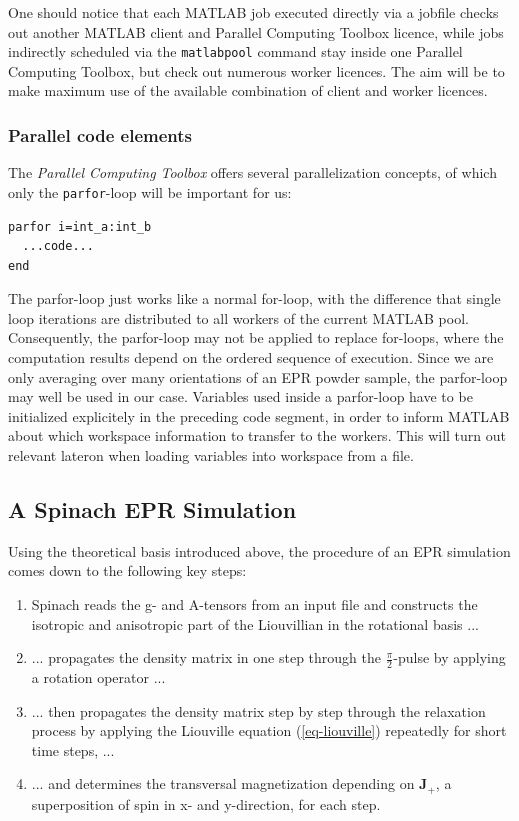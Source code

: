 \documentclass[11.5pt,a4paper]{article}
\begin{document}
One should notice that each MATLAB job executed directly via a jobfile checks out another MATLAB client and Parallel Computing Toolbox licence, while jobs indirectly scheduled via the \verb$matlabpool$ command stay inside one Parallel Computing Toolbox, but check out numerous worker licences. The aim will be to make maximum use of the available combination of client and worker licences.

\subsubsection{Parallel code elements}
The \emph{Parallel Computing Toolbox} offers several parallelization concepts, of which only the \verb$parfor$-loop will be important for us:
\begin{lstlisting}
parfor i=int_a:int_b
  ...code...
end
\end{lstlisting}

The parfor-loop just works like a normal for-loop, with the difference that single loop iterations are distributed to all workers of the current MATLAB pool. Consequently, the parfor-loop may not be applied to replace for-loops, where the computation results depend on the ordered sequence of execution. Since we are only averaging over many orientations of an EPR powder sample, the parfor-loop may well be used in our case. Variables used inside a parfor-loop have to be initialized explicitely in the preceding code segment, in order to inform MATLAB about which workspace information to transfer to the workers. This will turn out relevant lateron when loading variables into workspace from a file.

\subsection{A Spinach EPR Simulation}
Using the theoretical basis introduced above, the procedure of an EPR simulation comes down to the following key steps:
\begin{enumerate}
 \item Spinach reads the g- and A-tensors from an input file and constructs the isotropic and anisotropic part of the Liouvillian in the rotational basis ...
 \item ... propagates the density matrix in one step through the $\tfrac{\pi}{2}$-pulse by applying a rotation operator ...
  \item ... then propagates the density matrix step by step through the relaxation process by applying the Liouville equation (\ref{eq-liouville}) repeatedly for short time steps, ...
 \item ... and determines the transversal magnetization depending on $\mathbf{J_+}$, a superposition of spin in x- and y-direction, for each step.
\end{enumerate}
\end{document}

